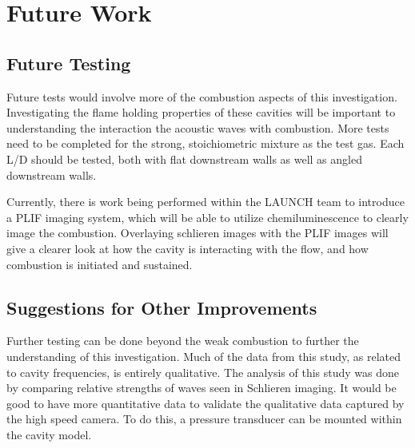 
\chapter{Future Work} %

\label{Chapter5} %



\section{Future Testing}

Future tests would involve more of the combustion aspects of this investigation. Investigating the flame holding properties of these cavities will be important to understanding the interaction the acoustic waves with combustion. More tests need to be completed for the strong, stoichiometric mixture as the test gas. Each L/D should be tested, both with flat downstream walls as well as angled downstream walls. 

Currently, there is work being performed within the LAUNCH team to introduce a PLIF imaging system, which will be able to utilize chemiluminescence to clearly image the combustion. Overlaying schlieren images with the PLIF images will give a clearer look at how the cavity is interacting with the flow, and how combustion is initiated and sustained. 




\section{Suggestions for Other Improvements}

Further testing can be done beyond the weak combustion to further the understanding of this investigation. Much of the data from this study, as related to cavity frequencies, is entirely qualitative. The analysis of this study was done by comparing relative strengths of waves seen in Schlieren imaging. It would be good to have more quantitative data to validate the qualitative data captured by the high speed camera. To do this, a pressure transducer can be mounted within the cavity model.  

